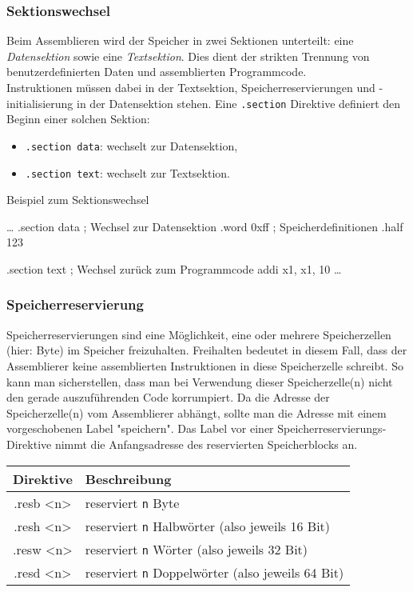 \subsubsection{Sektionswechsel}

Beim Assemblieren wird der Speicher in zwei Sektionen unterteilt: eine
\emph{Datensektion} sowie eine \emph{Textsektion}. Dies dient der strikten
Trennung von benutzerdefinierten Daten und assemblierten Programmcode.\\

Instruktionen müssen dabei in der Textsektion, Speicherreservierungen und
-initialisierung in der Datensektion stehen. Eine \texttt{.section} Direktive
definiert den Beginn einer solchen Sektion:

\begin{itemize}
  \item \texttt{.section data}: wechselt zur Datensektion,
  \item \texttt{.section text}: wechselt zur Textsektion.
\end{itemize}

\begin{exampleblock}{Beispiel zum Sektionswechsel}
	\begin{riscv}
	\dots
	.section data ; Wechsel zur Datensektion
	.word 0xff ; Speicherdefinitionen
	.half 123

	.section text ; Wechsel zurück zum Programmcode
	addi x1, x1, 10
	\dots
  \end{riscv}
\end{exampleblock}

\subsubsection{Speicherreservierung}
Speicherreservierungen sind eine Möglichkeit, eine oder mehrere Speicherzellen
(hier: Byte) im Speicher freizuhalten. Freihalten bedeutet in diesem Fall, dass der
Assemblierer keine assemblierten Instruktionen in diese Speicherzelle schreibt.
So kann man sicherstellen, dass man bei Verwendung dieser Speicherzelle(n) nicht
den gerade auszuführenden Code korrumpiert. Da die Adresse der Speicherzelle(n)
vom Assemblierer abhängt, sollte man die Adresse mit einem vorgeschobenen Label
"speichern". Das Label vor einer Speicherreservierungs-Direktive nimmt die
Anfangsadresse des reservierten Speicherblocks an.

\begin{table}[H]
\centering
	\begin{tabular}{>{\ttfamily}c l}
    \textbf{Direktive} & \textbf{Beschreibung}\\
    \toprule
		.resb <n> & reserviert \texttt{n} Byte\\
		.resh <n> & reserviert \texttt{n} Halbwörter (also jeweils 16 Bit)\\
		.resw <n> & reserviert \texttt{n} Wörter (also jeweils 32 Bit)\\
		.resd <n> & reserviert \texttt{n} Doppelwörter (also jeweils 64 Bit)\\
	\end{tabular}
\end{table}

